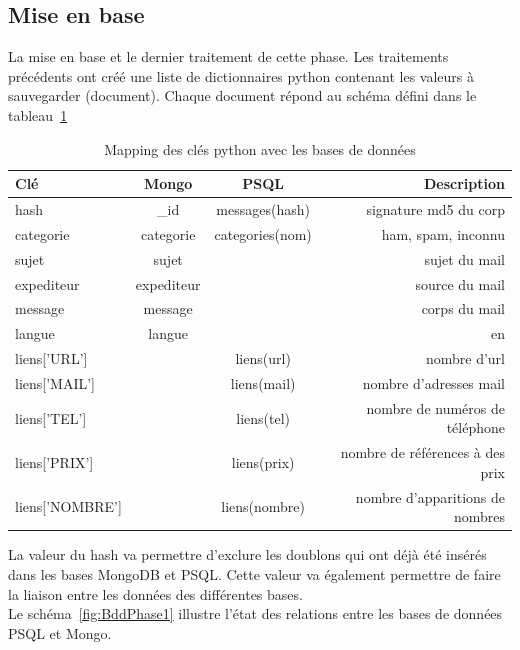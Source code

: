 \subsection{Mise en base}
    La mise en base et le dernier traitement de cette phase.
    Les traitements précédents ont créé une liste de dictionnaires python contenant les valeurs à sauvegarder (document).
    Chaque document répond au schéma défini dans le tableau~\ref{tab:mapping_fouille} \\
    \begin{table}[H]
        \begin{tabular}{lccr}
            Clé & Mongo & PSQL & Description\\
            \hline
            hash & \_id & messages(hash) & signature md5 du corp\\
            categorie & categorie & categories(nom) & ham, spam, inconnu\\
            sujet & sujet & & sujet du mail\\
            expediteur & expediteur & & source du mail\\
            message & message & & corps du mail\\
            langue & langue & & en\\
            liens['URL'] & & liens(url) & nombre d'url\\
            liens['MAIL'] & & liens(mail) & nombre d'adresses mail\\
            liens['TEL'] & & liens(tel) & nombre de numéros de téléphone\\
            liens['PRIX'] & & liens(prix) & nombre de références à des prix\\
            liens['NOMBRE'] & & liens(nombre) & nombre d'apparitions de nombres\\
            \hline
        \end{tabular}
        \caption{Mapping des clés python avec les bases de données}
        \label{tab:mapping_fouille}
    \end{table}

    La valeur du hash va permettre d'exclure les doublons qui ont déjà été insérés dans les bases MongoDB et PSQL\@.
    Cette valeur va également permettre de faire la liaison entre les données des différentes bases.\\
    Le schéma~\ref{fig:BddPhase1} illustre l'état des relations entre les bases de données PSQL et Mongo.


